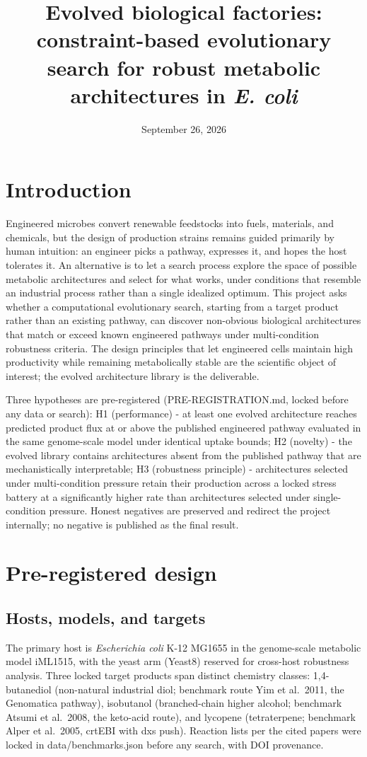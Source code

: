\documentclass[12pt,a4paper]{article}
\title{Evolved biological factories: constraint-based evolutionary search for robust metabolic architectures in \emph{E. coli}}
\author{}
\date{September 26, 2026}
\begin{document}
\maketitle

\section{Introduction}
Engineered microbes convert renewable feedstocks into fuels, materials, and chemicals, but the design of production strains remains guided primarily by human intuition: an engineer picks a pathway, expresses it, and hopes the host tolerates it. An alternative is to let a search process explore the space of possible metabolic architectures and select for what works, under conditions that resemble an industrial process rather than a single idealized optimum. This project asks whether a computational evolutionary search, starting from a target product rather than an existing pathway, can discover non-obvious biological architectures that match or exceed known engineered pathways under multi-condition robustness criteria. The design principles that let engineered cells maintain high productivity while remaining metabolically stable are the scientific object of interest; the evolved architecture library is the deliverable.

Three hypotheses are pre-registered (PRE-REGISTRATION.md, locked before any data or search): H1 (performance) - at least one evolved architecture reaches predicted product flux at or above the published engineered pathway evaluated in the same genome-scale model under identical uptake bounds; H2 (novelty) - the evolved library contains architectures absent from the published pathway that are mechanistically interpretable; H3 (robustness principle) - architectures selected under multi-condition pressure retain their production across a locked stress battery at a significantly higher rate than architectures selected under single-condition pressure. Honest negatives are preserved and redirect the project internally; no negative is published as the final result.

\section{Pre-registered design}
\subsection{Hosts, models, and targets}
The primary host is \emph{Escherichia coli} K-12 MG1655 in the genome-scale metabolic model iML1515, with the yeast arm (Yeast8) reserved for cross-host robustness analysis. Three locked target products span distinct chemistry classes: 1,4-butanediol (non-natural industrial diol; benchmark route Yim et al.\ 2011, the Genomatica pathway), isobutanol (branched-chain higher alcohol; benchmark Atsumi et al.\ 2008, the keto-acid route), and lycopene (tetraterpene; benchmark Alper et al.\ 2005, crtEBI with dxs push). Reaction lists per the cited papers were locked in data/benchmarks.json before any search, with DOI provenance.
\end{document}
